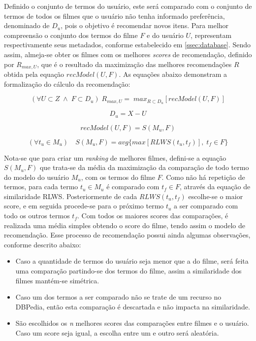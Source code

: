 Definido o conjunto de termos do usuário, este será comparado com o conjunto de termos de todos os filmes que o usuário não tenha informado preferência, denominado de $D_u$, pois o objetivo é recomendar novos itens. Para melhor compreensão o conjunto dos termos do filme $F$ e do usuário $U$, representam respectivamente seus metadados, conforme estabelecido em \ref{ssec:database}. Sendo assim, almeja-se obter os filmes com os melhores \textit{scores} de recomendação, definido por $R_{max, U}$, que é o resultado da maximização das melhores recomendações $R$ obtida pela equação $recModel(U, F)$. As equações abaixo demonstram a formalização do cálculo da recomendação:

\begin{equation}
	(\forall U \subset Z\; \land \; F \subset D_u)\; R_{max, U} = \; max_{R \subset D_u}[recModel(U, F)]
\label{eq:rec_model_max}
\end{equation}

\begin{equation}
	D_u = X - U
\label{eq:rec_model_movies}
\end{equation}

\begin{equation}
	recModel(U, F) = S(M_u, F)
\label{eq:rec_model_eq}
\end{equation}

\begin{equation}
	(\forall t_u \in M_u) \quad S(M_u, F) = avg \{max [RLWS(t_u, t_f)], \; t_f \in F\}
\label{eq:rec_model_similarity}
\end{equation}

Nota-se que para criar um \textit{ranking} de melhores filmes, defini-se a equação $S(M_u, F)$ que trata-se da média da maximização da comparação de todo termo do modelo do usuário $M_u$, com os termos do filme $F$. Como não há repetição de termos, para cada termo $t_u \in M_u$ é comparado com  $t_f \in F$, através da equação de similaridade \ac{RLWS}. Posteriormente de cada $RLWS(t_u, t_f)$ escolhe-se o maior score, e em seguida procede-se para o próximo termo $t_u$ a ser comparado com todo os outros termos $t_f$. Com todos os maiores scores das comparações, é realizada uma média simples obtendo o score do filme, tendo assim o modelo de recomendação. Esse processo de recomendação possui ainda algumas observações, conforme descrito abaixo:

\begin{itemize}
	\item{Caso a quantidade de termos do usuário seja menor que a do filme, será feita uma comparação partindo-se dos termos do filme, assim a similaridade dos filmes mantém-se simétrica.}
	\item{Caso um dos termos a ser comparado não se trate de um recurso no DBPedia, então esta comparação é descartada e não impacta na similaridade.}
	\item{São escolhidos os \textit{n} melhores scores das comparações entre filmes e o usuário. Caso um score seja igual, a escolha entre um e outro será aleatória.}
\end{itemize}

